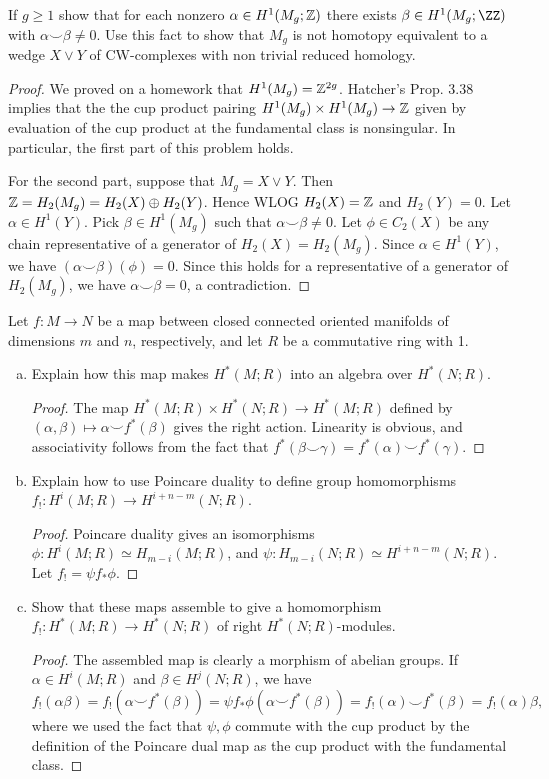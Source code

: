 \documentclass{article}
\begin{document}
 If $g \geq 1$ show that for each nonzero $\alpha \in H^1(M_g; \mathbb{Z})$ there exists $\beta \in H^1(M_g;\ZZ)$ with
$\alpha \smile \beta \neq 0$. Use this fact to show that $M_g$ is not homotopy equivalent to a wedge $X \vee Y$ of 
CW-complexes with non trivial reduced homology.

\begin{proof}
We proved on a homework that $H^1(M_g) = \mathbb{Z}^{2g}$. Hatcher's Prop. 3.38 implies that the the cup product pairing
$H^1(M_g) \times H^1(M_g) \to \mathbb{Z}$ given by evaluation of the cup product at the fundamental class is nonsingular. 
In particular, the first part of this problem holds.

For the second part, suppose that $M_g = X \vee Y$. Then $\mathbb{Z} = H_2(M_g) = H_2(X) \oplus H_2(Y)$.  Hence WLOG $H_2(X) = \mathbb{Z}$ and $H_2(Y) = 0$. 
Let $\alpha \in H^1(Y)$. Pick $\beta \in H^1(M_g)$ such that $\alpha \smile \beta \neq 0$.
Let $\phi \in C_2(X)$ be any chain representative of a generator of $H_2(X) = H_2(M_g)$.  Since $\alpha \in H^1(Y)$, we have
$(\alpha \smile \beta)(\phi) = 0$.  Since this holds for a representative of a generator of $H_2(M_g)$, we have $\alpha \smile \beta = 0$, a contradiction.
\end{proof}

 Let $f: M \to N$ be a map between closed connected oriented manifolds of dimensions $m$ and $n$, respectively, and let $R$ be a commutative ring with 1.
\begin{enumerate}[a.]
\item Explain how this map makes $H^*(M; R)$ into an algebra over $H^*(N; R)$.
\begin{proof}
The map $H^*(M; R) \times H^*(N; R) \to  H^*(M; R)$ defined by $(\alpha, \beta) \mapsto \alpha \smile f^*(\beta)$ gives the right action. Linearity is obvious, and associativity follows from the fact that $f^*(\beta \smile \gamma) = f^*(\alpha) \smile f^*(\gamma)$.
\end{proof}
\item Explain how to use Poincare duality to define group homomorphisms $f_!: H^i(M;R) \to H^{i+n-m}(N;R)$.
\begin{proof}
Poincare duality gives an isomorphisms $\phi:H^i(M;R) \simeq H_{m-i}(M;R)$, and 
$\psi:H_{m-i}(N;R) \simeq H^{i+n-m}(N;R)$. Let $f_! = \psi f_* \phi$.
\end{proof}
\item Show that these maps assemble to give a homomorphism $f_!:H^*(M;R) \to H^*(N;R)$ of right $H^*(N;R)$-modules.
\begin{proof}
The assembled map is clearly a morphism of abelian groups. If $\alpha \in H^i(M;R)$ and $\beta \in H^j(N;R)$,
we have $f_!(\alpha \beta)= f_!(\alpha \smile f^*(\beta)) = \psi f_* \phi (\alpha \smile f^*(\beta))
= f_!(\alpha) \smile f^*(\beta)
= f_!(\alpha) \beta,$ 
where we used the fact that $\psi, \phi$ commute with the cup product by the definition of the Poincare dual map as
the cup product with the fundamental class.
\end{proof}
\end{enumerate}
\end{document}
